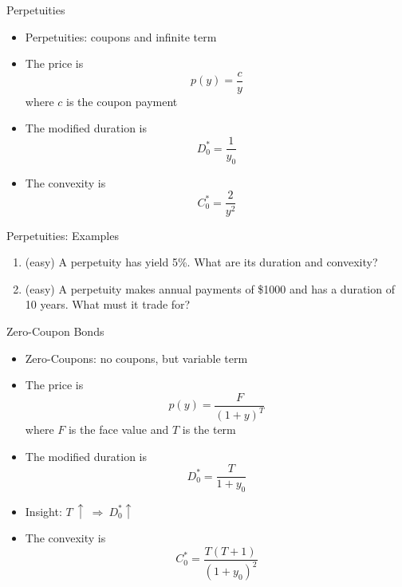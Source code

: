 \documentclass{beamer}
\begin{document}
\begin{frame}{Perpetuities}
    \begin{itemize}
        \item Perpetuities: coupons and infinite term
        \item The price is
            \begin{equation}
                p(y)=\frac{c}{y}
            \end{equation}
            where $c$ is the coupon payment
        \item The modified duration is 
            \begin{equation}
                D_{0}^{*}=\frac{1}{y_{0}}
            \end{equation}
        \item The convexity is
            \begin{equation}
                C_{0}^{*}=\frac{2}{y^{2}}
            \end{equation}
    \end{itemize}
\end{frame}

\begin{frame}{Perpetuities: Examples}
    \begin{enumerate}
        \item (easy) A perpetuity has yield 5\%. What are its duration and convexity? 
        \item (easy) A perpetuity makes annual payments of \$1000 and has a duration of 10 years. What must it trade for?
    \end{enumerate}
\end{frame}

\begin{frame}{Zero-Coupon Bonds}
    \begin{itemize}
        \item Zero-Coupons: no coupons, but variable term
        \item The price is
            \begin{equation}
                p(y)=\frac{F}{(1+y)^{T}}
            \end{equation}
            where $F$ is the face value and $T$ is the term
        \item The modified duration is 
            \begin{equation}
                D_{0}^{*}=\frac{T}{1+y_{0}}
            \end{equation}
        \item Insight: $T\:\uparrow\:\Rightarrow\:D_{0}^{*}\uparrow$
        \item The convexity is
            \begin{equation}
                C_{0}^{*}=\frac{T(T+1)}{(1+y_{0})^{2}}
            \end{equation}
    \end{itemize}
\end{frame}
\end{document}
